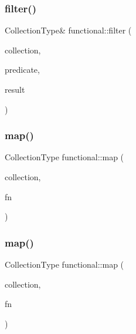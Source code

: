 \mbox{\label{namespacefunctional_a594945f3d85ae414fe97ff74fe8f37cf}} 
\subsubsection{\texorpdfstring{filter()}{filter()}\hspace{0.1cm}{\footnotesize\ttfamily [4/4]}}
{\footnotesize\ttfamily Collection\+Type\& functional\+::filter (\begin{DoxyParamCaption}\item[{Collection\+Type}]{collection,  }\item[{bool($\ast$)(const Element\+Type \&)}]{predicate,  }\item[{Collection\+Type \&}]{result }\end{DoxyParamCaption})}

\mbox{\label{namespacefunctional_ab335718655fa5514cec86fba6ff9d17b}} 
\subsubsection{\texorpdfstring{map()}{map()}\hspace{0.1cm}{\footnotesize\ttfamily [1/4]}}
{\footnotesize\ttfamily Collection\+Type functional\+::map (\begin{DoxyParamCaption}\item[{Collection\+Type}]{collection,  }\item[{Element\+Type($\ast$)(Element\+Type)}]{fn }\end{DoxyParamCaption})}

\mbox{\label{namespacefunctional_ad8c726e74a75223fe88a00c22fc8142b}} 
\subsubsection{\texorpdfstring{map()}{map()}\hspace{0.1cm}{\footnotesize\ttfamily [2/4]}}
{\footnotesize\ttfamily Collection\+Type functional\+::map (\begin{DoxyParamCaption}\item[{Collection\+Type}]{collection,  }\item[{Element\+Type($\ast$)(const Element\+Type \&)}]{fn }\end{DoxyParamCaption})}

